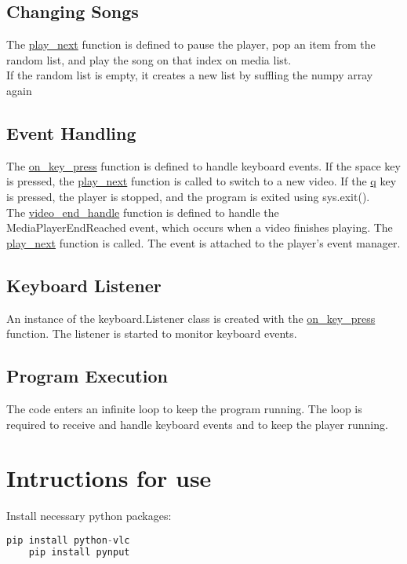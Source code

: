 \documentclass[journal,12pt,twocolumn]{IEEEtran}
\begin{document}
\subsection{Changing Songs}
The \underline{play\_next} function is defined to pause the player, pop an item from the random list, and play the song on that index on media list.\\
If the random list is empty, it creates a new list by suffling the numpy array again

\subsection{Event Handling}
The \underline{on\_key\_press} function is defined to handle keyboard events. If the space key is pressed, the \underline{play\_next} function is called to switch to a new video. If the \underline{q} key is pressed, the player is stopped, and the program is exited using sys.exit().\\
The \underline{video\_end\_handle} function is defined to handle the MediaPlayerEndReached event, which occurs when a video finishes playing. The \underline{play\_next} function is called. The event is attached to the player's event manager.

\subsection{Keyboard Listener}
An instance of the keyboard.Listener class is created with the \underline{on\_key\_press} function. The listener is started to monitor keyboard events.

\subsection{Program Execution}
The code enters an infinite loop to keep the program running. The loop is required to receive and handle keyboard events and to keep the player running.


\section{Intructions for use}

Install necessary python packages:

\begin{mdframed}[style=codebox]
\lstset{style=mystyle}
\begin{lstlisting}[language=Python]
    pip install python-vlc
    pip install pynput
\end{lstlisting}
\end{mdframed}
\end{document}
